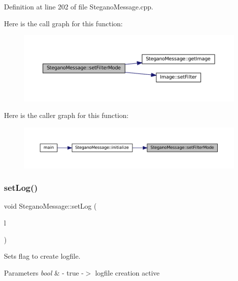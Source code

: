 Definition at line 202 of file Stegano\+Message.\+cpp.

Here is the call graph for this function\+:\nopagebreak
\begin{figure}[H]
\begin{center}
\leavevmode
\includegraphics[width=350pt]{classSteganoMessage_a5c3ef910b17f4bbe32a73a33be9d7586_cgraph}
\end{center}
\end{figure}
Here is the caller graph for this function\+:\nopagebreak
\begin{figure}[H]
\begin{center}
\leavevmode
\includegraphics[width=350pt]{classSteganoMessage_a5c3ef910b17f4bbe32a73a33be9d7586_icgraph}
\end{center}
\end{figure}
\mbox{\label{classSteganoMessage_a438e9d5189a8e3b83021fada4a6a469c}} 
\subsubsection{\texorpdfstring{setLog()}{setLog()}}
{\footnotesize\ttfamily void Stegano\+Message\+::set\+Log (\begin{DoxyParamCaption}\item[{bool}]{l }\end{DoxyParamCaption})}



Sets flag to create logfile. 


\begin{DoxyParams}{Parameters}
{\em bool} & -\/ true -\/$>$ logfile creation active \\
\hline
\end{DoxyParams}


